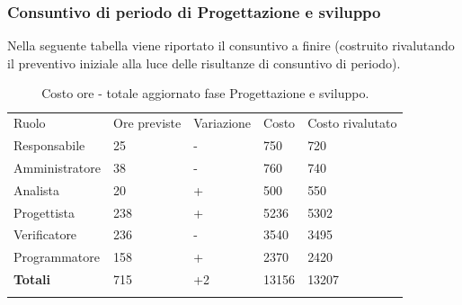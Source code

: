 \documentclass[a4paper]{article}
\begin{document}
				\subsubsection{Consuntivo di periodo di Progettazione e sviluppo}
					Nella seguente tabella viene riportato il consuntivo a finire (costruito rivalutando il preventivo iniziale alla luce delle risultanze 
					di consuntivo di periodo).
					\begin{table}[H]
						\begin{tabularx}{\textwidth}{Y Y Y Y Y}
							Ruolo & Ore previste & Variazione & Costo & Costo rivalutato\\
							Responsabile & 25 & - & 750 & 720 \\
							Amministratore & 38 & - & 760 & 740 \\
							Analista & 20 & + & 500 & 550\\
							Progettista & 238 & + & 5236 & 5302\\
							Verificatore & 236 & - & 3540 & 3495\\
							Programmatore & 158 & + & 2370 & 2420\\
							\textbf{Totali} & 715 & +2 & 13156 & 13207\\
						\end{tabularx}
					\caption{Costo ore - totale aggiornato fase Progettazione e sviluppo.}
					\label{TCRendicontati}
					\end{table}
                    
\end{document}
